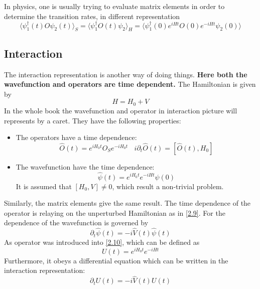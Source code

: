 In physics, one is usually trying to evaluate matrix elements in order to determine the transition rates, in different representation
\begin{equation}
  \label{2.6}
  \langle \psi^\dagger_1(t) O \psi_2(t)\rangle_S = \langle \psi^\dagger_1 O(t) \psi_2 \rangle_H = \langle \psi^\dagger_1(0) e^{i Ht} O(0) e^{-i Ht} \psi_2(0) \rangle
\end{equation}

\subsection{Interaction}
The interaction representation is another way of doing things.
{\bf Here both the wavefunction and operators are time dependent.}
The Hamiltonian is given by
\begin{equation}
H= H_0 +V \label{2.8}
\end{equation}
In the whole book the wavefunction and operator in interaction picture will represents by a caret.
They have the following properties:
\begin{itemize}
\item The operators have a time dependence:
\begin{equation}
  \hat{O}(t) = e^{iH_0 t}O_S e^{-iH_0 t} ~ ~ ~ ~ i\partial_t \hat{O}(t) = [\hat{O}(t),H_0]\label{2.9}
\end{equation}
\item The wavefunction have the time dependence:
\begin{equation}
  \hat{\psi}(t) = e^{iH_0 t}e^{-iHt} \psi(0) \label{2.10}
\end{equation}
It is assumed that $[H_0,V]\neq 0$, which result a non-trivial problem.
\end{itemize}
Similarly, the matrix elements give the same result.
The time dependence of the operator is relaying on the unperturbed Hamiltonian as in \eqref{2.9}.
For the dependence of the wavefunction is governed by
\begin{equation}
  \partial_t \hat{\psi}(t) = -i\hat{V}(t) \hat{\psi}(t) \label{2.13}
\end{equation}
As operator was introduced into \eqref{2.10}, which can be defined as
\begin{equation}
  U(t) = e^{iH_0 t} e^{-i Ht} \label{2.14}
\end{equation}
Furthermore, it obeys a differential equation which can be written in the interaction representation:
\begin{equation}
  \partial_t U(t) = -i \hat{V}(t) U(t) \label{2.15}
\end{equation}
